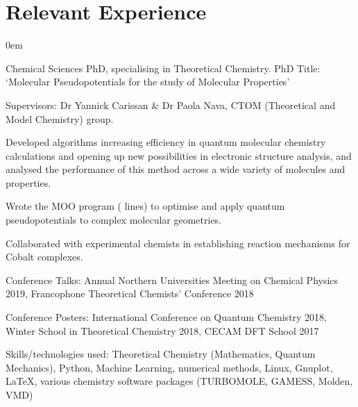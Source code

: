 \documentclass[letterpaper]{deedy-resume-openfont} %
\begin{document}
\begin{minipage}[t]{0.66\textwidth} %


\section{Relevant Experience}


\vspace{\topsep} %
\begin{tightemize}
\itemsep0em
\item Chemical Sciences PhD, specialising in Theoretical Chemistry.  PhD Title: `Molecular Pseudopotentials for the study of Molecular Properties'
\item Supervisors: Dr Yannick Carissan \& Dr Paola Nava, CTOM (Theoretical and Model Chemistry) group.
\item Developed algorithms increasing efficiency in quantum molecular chemistry calculations and opening up new possibilities in electronic structure analysis, and analysed the performance of this method across a wide variety of molecules and properties.
\item Wrote the MOO program ( lines) to optimise and apply quantum pseudopotentials to complex molecular geometries.
\item Collaborated with experimental chemists in establishing reaction mechanisms for Cobalt complexes.
\item Conference Talks: Annual Northern Universities Meeting on Chemical Physics 2019, Francophone Theoretical Chemists' Conference 2018
\item Conference Posters: International Conference on Quantum Chemistry 2018, Winter School in Theoretical Chemistry 2018, CECAM DFT School 2017
\item Skills/technologies used: Theoretical Chemistry (Mathematics, Quantum Mechanics), Python, Machine Learning, numerical methods, Linux, Gnuplot, LaTeX, various chemistry software packages (TURBOMOLE, GAMESS, Molden, VMD)
\end{tightemize}

\sectionspace %


\end{minipage}
\end{document}
